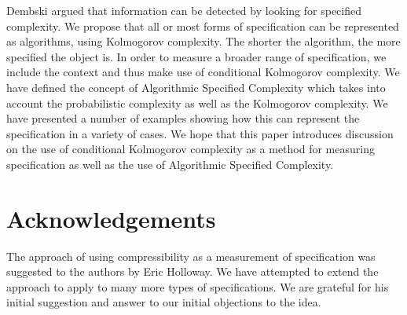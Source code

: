 Dembski argued that information can be detected by looking for specified complexity.
We propose that all or most forms of specification can be represented as algorithms, using Kolmogorov complexity.
The shorter the algorithm, the more specified the object is.
In order to measure a broader range of specification, we include the context and thus make use of conditional Kolmogorov complexity.
We have defined the concept of Algorithmic Specified Complexity which takes into account the probabilistic complexity as well as the Kolmogorov complexity. 
We have presented a number of examples showing how this can represent the specification in a variety of cases.
We hope that this paper introduces discussion on the use of conditional Kolmogorov complexity as a method for measuring specification as well as the use of Algorithmic Specified Complexity.

\section*{Acknowledgements}

The approach of using compressibility as a measurement of specification was suggested to the authors by Eric Holloway.
We have attempted to extend the approach to apply to many more types of specifications.
We are grateful for his initial suggestion and answer to our initial objections to the idea.

